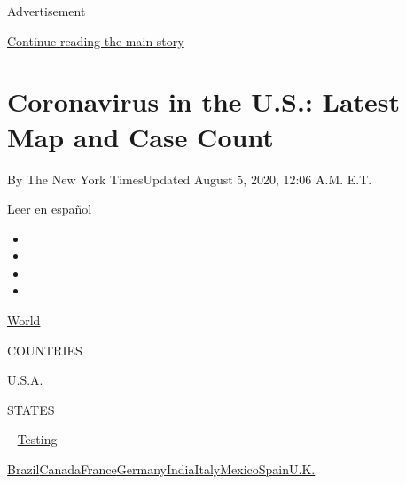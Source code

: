 Advertisement

\protect\hyperlink{after-top}{Continue reading the main story}

\hypertarget{coronavirus-in-the-us-latest-map-and-case-count}{%
\section{Coronavirus in the U.S.: Latest Map and Case
Count}\label{coronavirus-in-the-us-latest-map-and-case-count}}

By The New York TimesUpdated August 5, 2020, 12:06 A.M. E.T.

\href{https://www.nytimes3xbfgragh.onion/es/interactive/2020/espanol/mundo/coronavirus-en-estados-unidos.html}{Leer
en español}

\begin{itemize}
\item
\item
\item
\item
\end{itemize}

\href{https://www.nytimes3xbfgragh.onion/interactive/2020/world/coronavirus-maps.html}{World}~

COUNTRIES

\textbar{}
\href{https://www.nytimes3xbfgragh.onion/interactive/2020/us/coronavirus-us-cases.html}{U.S.A.}~

STATES

~
\href{https://www.nytimes3xbfgragh.onion/interactive/2020/us/coronavirus-testing.html}{Testing}

\href{https://www.nytimes3xbfgragh.onion/interactive/2020/world/americas/brazil-coronavirus-cases.html}{Brazil}\href{https://www.nytimes3xbfgragh.onion/interactive/2020/world/canada/canada-coronavirus-cases.html}{Canada}\href{https://www.nytimes3xbfgragh.onion/interactive/2020/world/europe/france-coronavirus-cases.html}{France}\href{https://www.nytimes3xbfgragh.onion/interactive/2020/world/europe/germany-coronavirus-cases.html}{Germany}\href{https://www.nytimes3xbfgragh.onion/interactive/2020/world/asia/india-coronavirus-cases.html}{India}\href{https://www.nytimes3xbfgragh.onion/interactive/2020/world/europe/italy-coronavirus-cases.html}{Italy}\href{https://www.nytimes3xbfgragh.onion/interactive/2020/world/americas/mexico-coronavirus-cases.html}{Mexico}\href{https://www.nytimes3xbfgragh.onion/interactive/2020/world/europe/spain-coronavirus-cases.html}{Spain}\href{https://www.nytimes3xbfgragh.onion/interactive/2020/world/europe/united-kingdom-coronavirus-cases.html}{U.K.}

